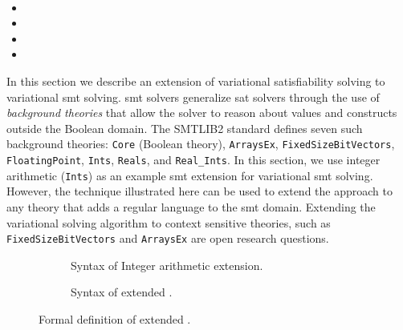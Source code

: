 ~\label{sec:vsmt}

\begin{itemize}
\item {}
\item {}
\item {}
\item {}
\end{itemize}

In this section we describe an extension of variational satisfiability solving
to variational \ac{smt} solving.
%
%
\ac{smt} solvers generalize \ac{sat} solvers through the use of
\emph{background theories} that allow the solver to reason about values and
constructs outside the Boolean domain. The SMTLIB2 standard defines seven such
background theories: \texttt{Core} (Boolean theory), \texttt{ArraysEx},
\texttt{FixedSizeBitVectors}, \texttt{FloatingPoint}, \texttt{Ints},
\texttt{Reals}, and \texttt{Real\_Ints}. In this section, we use integer
arithmetic (\texttt{Ints}) as an example \ac{smt} extension for variational
\ac{smt} solving. However, the technique illustrated here can be used to extend
the approach to any theory that adds a regular language to the \ac{smt} domain.
%
%
Extending the variational solving algorithm to context sensitive
theories, such as \texttt{FixedSizeBitVectors} and \texttt{ArraysEx} are open
research questions.

\begin{figure}
  \begin{subfigure}[t]{\linewidth}
    \centering
    
    \caption{Syntax of Integer arithmetic extension.}%
    \label{fig:arith:stx}
  \end{subfigure}
  \begin{subfigure}[t]{\linewidth}
    
    \centering
    \caption{Syntax of extended \vpl{}.}%
    \label{fig:arith:vpl}
  \end{subfigure}
  \caption{Formal definition of extended \vpl{}.}%
  \label{fig:ex:vpl}
\end{figure}

